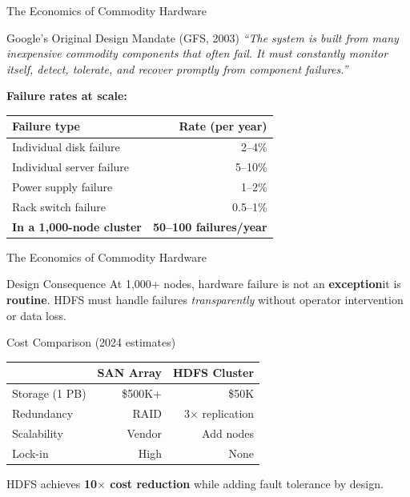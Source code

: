 \documentclass[aspectratio=169,10pt]{beamer}
\begin{document}
\begin{frame}{The Economics of Commodity Hardware}
   
      \begin{block}{Google's Original Design Mandate (GFS, 2003)}
        \textit{``The system is built from many inexpensive commodity components that often fail.  It must constantly monitor itself, detect, tolerate, and recover promptly from component failures.''}
      \end{block}
      \vspace{6pt}
      \textbf{Failure rates at scale:}
      \vspace{4pt}
      \renewcommand{\arraystretch}{1.2}
      \begin{tabular}{lr}
        \toprule
        \textbf{Failure type} & \textbf{Rate (per year)} \\
        \midrule
        Individual disk failure    & 2--4\% \\
        Individual server failure  & 5--10\% \\
        Power supply failure       & 1--2\% \\
        Rack switch failure        & 0.5--1\% \\
        \midrule
        \textbf{In a 1{,}000-node cluster} & \textbf{50--100 failures/year} \\
        \bottomrule
      \end{tabular}

    
\end{frame}
\begin{frame}{The Economics of Commodity Hardware}
   
      
      \begin{alertblock}{Design Consequence}
        At 1{,}000+ nodes, hardware failure is not an \textbf{exception}\textemdash it is \textbf{routine}.  HDFS must handle failures \emph{transparently} without operator intervention or data loss.
      \end{alertblock}
      \vspace{6pt}
      \begin{exampleblock}{Cost Comparison (2024 estimates)}
        \small
        \begin{tabular}{lrr}
          \toprule
          & \textbf{SAN Array} & \textbf{HDFS Cluster} \\
          \midrule
          Storage (1 PB)  & \$500K+ & \$50K \\
          Redundancy      & RAID     & 3$\times$ replication \\
          Scalability     & Vendor   & Add nodes\\
          Lock-in         & High     & None \\
          \bottomrule
        \end{tabular}

       
      \end{exampleblock}
       \vspace{4pt}
        HDFS achieves \textbf{10$\times$ cost reduction} while adding fault tolerance by design.
   
\end{frame}
\end{document}
